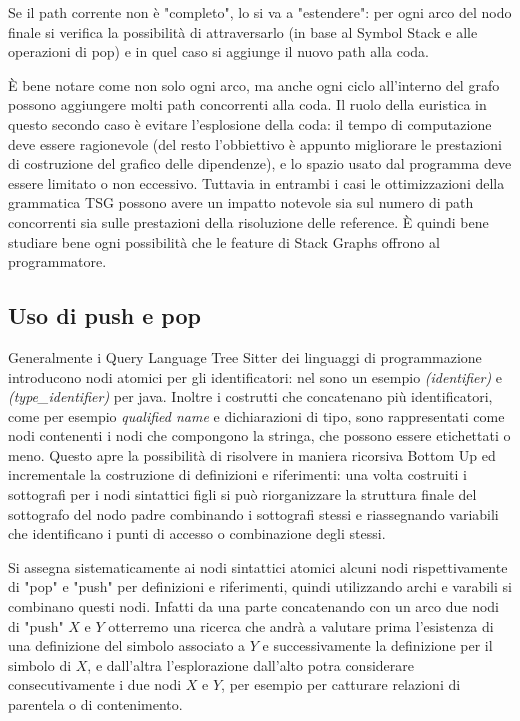 \par
Se il path corrente non \`e "completo", lo si va a "estendere": per ogni arco del nodo finale si verifica la possibilit\`a di attraversarlo (in base al Symbol Stack e alle operazioni di pop) e in quel caso si aggiunge il nuovo path alla coda.

\par
\`E bene notare come non solo ogni arco, ma anche ogni ciclo all'interno del grafo possono aggiungere molti path concorrenti alla coda.
Il ruolo della euristica in questo secondo caso \`e evitare l'esplosione della coda: il tempo di computazione deve essere ragionevole (del resto l'obbiettivo \`e appunto migliorare le prestazioni di costruzione del grafico delle dipendenze), e lo spazio usato dal programma deve essere limitato o non eccessivo.
Tuttavia in entrambi i casi le ottimizzazioni della grammatica TSG possono avere un impatto notevole sia sul numero di path concorrenti sia sulle prestazioni della risoluzione delle reference. \`E quindi bene studiare bene ogni possibilit\`a che le feature di Stack Graphs offrono al programmatore.

\subsection{Uso di push e pop}

Generalmente i Query Language Tree Sitter dei linguaggi di programmazione introducono nodi atomici per gli identificatori: nel sono un esempio \emph{(identifier)} e \emph{(type\_identifier)} per java.
Inoltre i costrutti che concatenano pi\`u identificatori, come per esempio \emph{qualified name} e dichiarazioni di tipo, sono rappresentati come nodi contenenti i nodi che compongono la stringa, che possono essere etichettati o meno.
Questo apre la possibilit\`a di risolvere in maniera ricorsiva Bottom Up ed incrementale la costruzione di definizioni e riferimenti: una volta costruiti i sottografi per i nodi sintattici figli si pu\`o riorganizzare la struttura finale del sottografo del nodo padre combinando i sottografi stessi e riassegnando variabili che identificano i punti di accesso o combinazione degli stessi.

\par
Si assegna sistematicamente ai nodi sintattici atomici alcuni nodi rispettivamente di "pop" e "push" per definizioni e riferimenti, quindi utilizzando archi e varabili si combinano questi nodi.
Infatti da una parte concatenando con un arco due nodi di "push" $X$ e $Y$ otterremo una ricerca che andr\`a a valutare prima l'esistenza di una definizione del simbolo associato a $Y$ e successivamente la definizione per il simbolo di $X$, e dall'altra l'esplorazione dall'alto potra considerare consecutivamente i due nodi $X$ e $Y$, per esempio per catturare relazioni di parentela o di contenimento.

